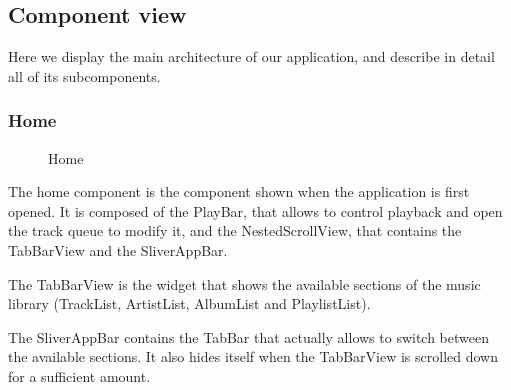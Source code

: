 \documentclass{article}
\begin{document}
\subsection{Component view}
Here we display the main architecture of our application, and describe in detail
all of its subcomponents.

\subsubsection{Home}

\begin{figure}[H]
	\noindent
	\caption{Home} 
\end{figure}

The home component is the component shown when the application is first opened.
It is composed of the PlayBar, that allows to control playback and open the
track queue to modify it, and the NestedScrollView, that contains the TabBarView
and the SliverAppBar.

The TabBarView is the widget that shows the available
sections of the music library (TrackList, ArtistList, AlbumList and
PlaylistList).

The SliverAppBar contains the TabBar that actually allows to switch between the
available sections. It also hides itself when the TabBarView is scrolled down
for a sufficient amount.
 
\end{document}
